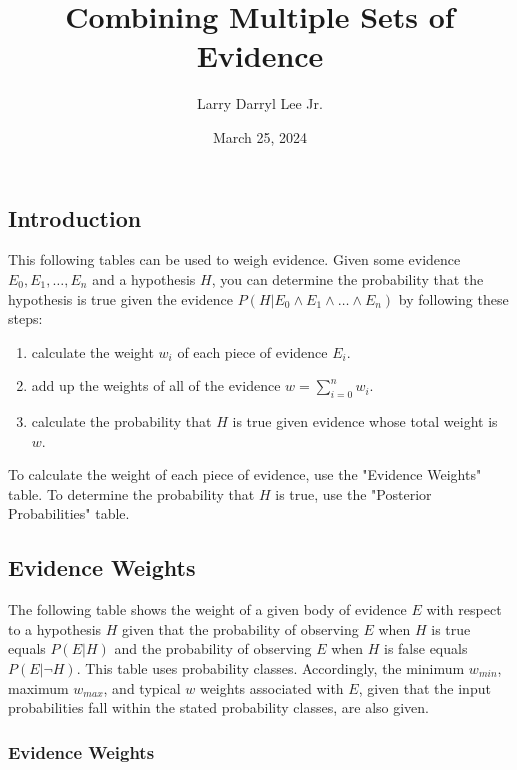\documentclass[
]{article}
\title{Combining Multiple Sets of Evidence}
\date{March 25,  2024}
\author{Larry Darryl Lee Jr.}
\begin{document}
\maketitle

\subsection{Introduction}\label{introduction}

This following tables can be used to weigh evidence. Given some evidence
\(E_0, E_1, \ldots, E_n\) and a hypothesis \(H\), you can determine the
probability that the hypothesis is true given the evidence
\(P(H|E_0 \wedge E_1 \wedge \ldots \wedge E_n)\) by following these
steps:

\begin{enumerate}
\def\labelenumi{\arabic{enumi}.}
\item
  calculate the weight \(w_i\) of each piece of evidence \(E_i\).
\item
  add up the weights of all of the evidence \(w = \sum_{i = 0}^n w_i\).
\item
  calculate the probability that \(H\) is true given evidence whose
  total weight is \(w\).
\end{enumerate}

To calculate the weight of each piece of evidence, use the "Evidence
Weights" table. To determine the probability that \(H\) is true, use the
"Posterior Probabilities" table.

\pagebreak
\subsection{Evidence Weights}\label{evidence-weights}

The following table shows the weight of a given body of evidence \(E\)
with respect to a hypothesis \(H\) given that the probability of
observing \(E\) when \(H\) is true equals \(P(E|H)\) and the probability
of observing \(E\) when \(H\) is false equals \(P(E|\neg H)\). This
table uses probability classes. Accordingly, the minimum \(w_{min}\),
maximum \(w_{max}\), and typical \(w\) weights associated with \(E\),
given that the input probabilities fall within the stated probability
classes, are also given.

\subsubsection{Evidence Weights}\label{evidence-weights-2}
\end{document}
